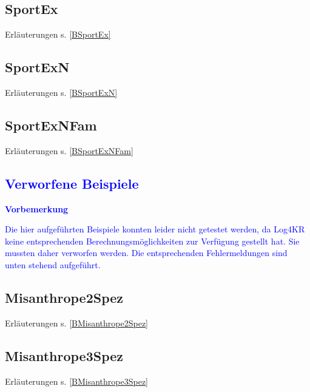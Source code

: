 \documentclass[a4paper, 11pt]{book}
\begin{document}
\section{SportEx} Erläuterungen s. \ref{BSportEx}
\label{SportEx}

\newpage


\section{SportExN} Erläuterungen s. \ref{BSportExN}
\label{SportExN}



\newpage

\section{SportExNFam} Erläuterungen s. \ref{BSportExNFam}
\label{SportExNFam}



\newpage


\textcolor{blue}{
\chapter{Verworfene Beispiele}
\label{examplesdep}
\textbf{Vorbemerkung}
}
\textcolor{blue}{
\noindent
Die hier aufgeführten Beispiele konnten leider nicht getestet werden, da Log4KR keine entsprechenden Berechnungsmöglichkeiten zur Verfügung gestellt hat. Sie mussten daher verworfen werden. Die entsprechenden Fehlermeldungen sind unten stehend aufgeführt.
}
\section{Misanthrope2Spez} Erläuterungen s. \ref{BMisanthrope2Spez}
\label{Misanthrope2Spez}


\newpage


\section{Misanthrope3Spez} Erläuterungen s. \ref{BMisanthrope3Spez}
\label{Misanthrope3Spez}

\end{document}
